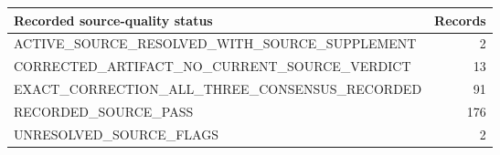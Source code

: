 \begin{tabular}{lr}
\toprule
Recorded source-quality status & Records \\
\midrule
ACTIVE\_SOURCE\_RESOLVED\_WITH\_SOURCE\_SUPPLEMENT & 2 \\
CORRECTED\_ARTIFACT\_NO\_CURRENT\_SOURCE\_VERDICT & 13 \\
EXACT\_CORRECTION\_ALL\_THREE\_CONSENSUS\_RECORDED & 91 \\
RECORDED\_SOURCE\_PASS & 176 \\
UNRESOLVED\_SOURCE\_FLAGS & 2 \\
\bottomrule
\end{tabular}

